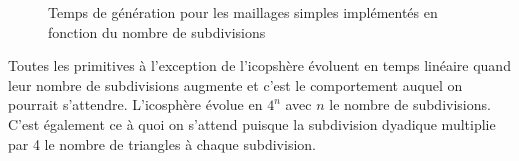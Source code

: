 \begin{figure}[h!]

	\caption{Temps de génération pour les maillages simples implémentés en fonction du nombre de subdivisions}
\end{figure}
\FloatBarrier

Toutes les primitives à l'exception de l'icopshère évoluent en temps linéaire quand leur nombre de subdivisions 
augmente et c'est le comportement auquel on pourrait s'attendre. L'icosphère évolue en $4^n$ avec $n$ le nombre 
de subdivisions. C'est également ce à quoi on s'attend puisque la subdivision dyadique multiplie par 4 le nombre 
de triangles à chaque subdivision.
